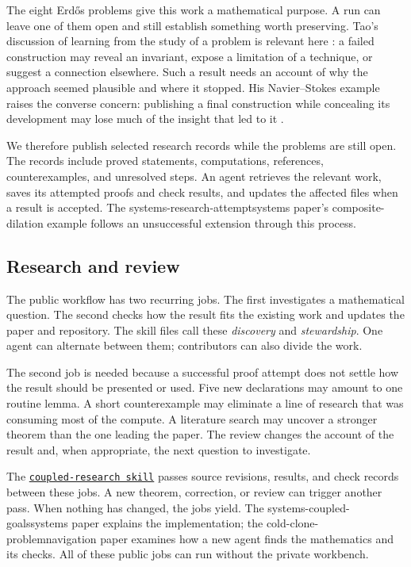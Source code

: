 \documentclass[10pt]{article}
\newcommand{\repobase}{https://github.com/wcook04/plectis-erdos}
\newcommand{\repolink}[2]{\href{\repobase/blob/ca0e13f8acf5ccf48506e4bdb870953d3a0856fa/#1}{\texttt{#2}}}
\begin{document}
The eight Erd\H{o}s problems give this work a mathematical purpose. A run can
leave one of them open and still establish something worth preserving.
Tao's discussion of learning from the study of a problem is relevant here
\cite{taolearning2026}: a failed construction may reveal an invariant, expose
a limitation of a technique, or suggest a connection elsewhere. Such a result
needs an account of why the approach seemed plausible and where it stopped.
His Navier--Stokes example raises the converse concern: publishing a final
construction while concealing its development may lose much of the insight
that led to it \cite{taoexploration2026}.

We therefore publish selected research records while the problems are still
open. The records include proved statements, computations, references,
counterexamples, and unresolved steps. An agent retrieves the relevant work,
saves its attempted proofs and check results, and updates the affected files
when a result is accepted. The
%
{systems-research-attempt}{systems paper's composite-dilation example}
follows an unsuccessful extension through this process.

\subsection*{Research and review}

The public workflow has two recurring jobs. The first investigates a
mathematical question. The second checks how the result fits the existing
work and updates the paper and repository. The skill files call these
\emph{discovery} and \emph{stewardship}. One agent can alternate between them;
contributors can also divide the work.

The second job is needed because a successful proof attempt does not settle
how the result should be presented or used. Five new declarations may amount
to one routine lemma. A short counterexample may eliminate a line of research
that was consuming most of the compute. A literature search may uncover a
stronger theorem than the one leading the paper. The review changes the
account of the result and, when appropriate, the next question to investigate.

The \repolink{skills/run-coupled-research-goals/SKILL.md}%
{coupled-research skill} passes source revisions, results, and check records
between these jobs. A new theorem, correction, or review can trigger another
pass. When nothing has changed, the jobs yield. The
%
{systems-coupled-goals}{systems paper} explains the implementation; the
%
{cold-clone-problem}{navigation paper} examines how a new agent finds the
mathematics and its checks. All of these public jobs can run without the
private workbench.
\end{document}
